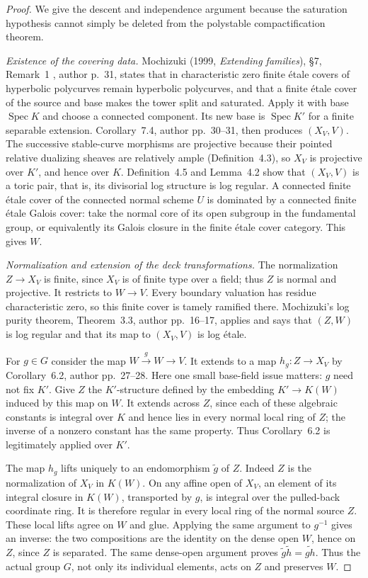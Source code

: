 \begin{proof}
We give the descent and independence argument because the
saturation hypothesis cannot simply be deleted from the
polystable compactification theorem.

\emph{Existence of the covering data.}
Mochizuki (1999, \emph{Extending families}), \S7, Remark~1
\cite{A567_Mochizuki1999Extending},
author p.~31, states that in characteristic zero finite \'etale
covers of hyperbolic polycurves remain hyperbolic polycurves,
and that a finite \'etale cover of the source and base makes
the tower split and saturated. Apply it with base $\operatorname{Spec}K$
and choose a connected component. Its new base is
$\operatorname{Spec}K'$ for a finite separable extension.
Corollary~7.4, author pp.~30--31, then produces $(X_V,V)$.
The successive stable-curve morphisms are projective because
their pointed relative dualizing sheaves are relatively ample
(Definition~4.3), so $X_V$ is projective over $K'$, and hence
over $K$. Definition~4.5 and Lemma~4.2 show that $(X_V,V)$
is a toric pair, that is, its divisorial log structure is log regular.
A connected finite \'etale cover of the connected normal scheme
$U$ is dominated by a connected finite \'etale Galois cover:
take the normal core of its open subgroup in the fundamental
group, or equivalently its Galois closure in the finite \'etale
cover category. This gives $W$.

\emph{Normalization and extension of the deck transformations.}
The normalization $Z\to X_V$ is finite, since $X_V$ is of
finite type over a field; thus $Z$ is normal and projective.
It restricts to $W\to V$. Every boundary valuation has residue
characteristic zero, so this finite cover is tamely ramified
there. Mochizuki's log purity theorem, Theorem~3.3, author
pp.~16--17, applies and says that $(Z,W)$ is log regular and
that its map to $(X_V,V)$ is log \'etale.

For $g\in G$ consider the map $W\xrightarrow{g}W\to V$.
It extends to a map $h_g:Z\to X_V$ by Corollary~6.2,
author pp.~27--28. Here one small base-field issue matters:
$g$ need not fix $K'$. Give $Z$ the $K'$-structure defined
by the embedding $K'\to K(W)$ induced by this map on $W$.
It extends across $Z$, since each of these algebraic constants
is integral over $K$ and hence lies in every normal local ring
of $Z$; the inverse of a nonzero constant has the same property.
Thus Corollary~6.2 is legitimately applied over $K'$.

The map $h_g$ lifts uniquely to an endomorphism $\widetilde g$
of $Z$. Indeed $Z$ is the normalization of $X_V$ in $K(W)$.
On any affine open of $X_V$, an element of its integral closure
in $K(W)$, transported by $g$, is integral over the pulled-back
coordinate ring. It is therefore regular in every local ring
of the normal source $Z$. These local lifts agree on $W$ and
glue. Applying the same argument to $g^{-1}$ gives an inverse:
the two compositions are the identity on the dense open $W$,
hence on $Z$, since $Z$ is separated. The same dense-open
argument proves $\widetilde g\widetilde h=\widetilde{gh}$.
Thus the actual group $G$, not only its individual elements,
acts on $Z$ and preserves $W$.


\end{proof}
